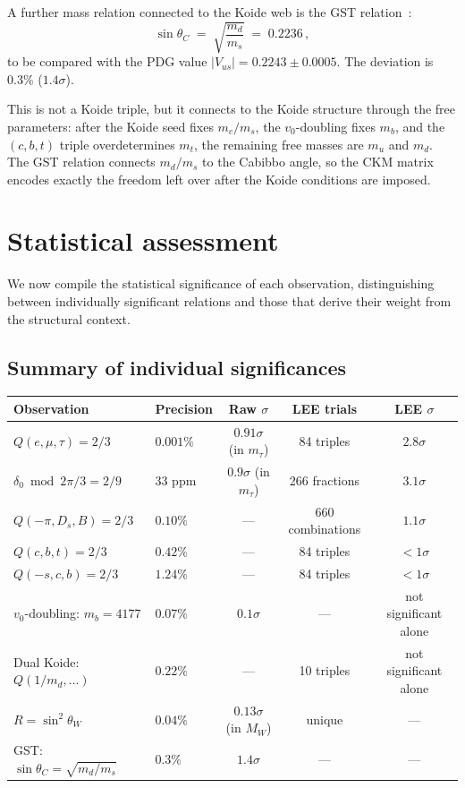 \documentclass[12pt,a4paper]{article}
\begin{document}
A further mass relation connected to the Koide web is the GST
relation~\cite{GST1968}:
\begin{equation}
\sin\theta_C \;=\; \sqrt{\frac{m_d}{m_s}} \;=\; 0.2236\,,
\end{equation}
to be compared with the PDG value $|V_{us}| = 0.2243 \pm 0.0005$.
The deviation is $0.3\%$ ($1.4\sigma$).

This is not a Koide triple, but it connects to the Koide structure
through the free parameters: after the Koide seed fixes $m_c/m_s$,
the $v_0$-doubling fixes $m_b$, and the $(c,b,t)$ triple
overdetermines $m_t$, the remaining free masses are $m_u$ and $m_d$.
The GST relation connects $m_d/m_s$ to the Cabibbo angle, so the
CKM matrix encodes exactly the freedom left over after the Koide
conditions are imposed.

\section{Statistical assessment}

We now compile the statistical significance of each observation,
distinguishing between individually significant relations and those
that derive their weight from the structural context.

\subsection{Summary of individual significances}

\begin{center}
\small
\begin{tabular}{llccc}
\toprule
Observation & Precision & Raw $\sigma$ & LEE trials & LEE $\sigma$ \\
\midrule
$Q(e,\mu,\tau) = 2/3$ & $0.001\%$ & $0.91\sigma$ (in $m_\tau$) & 84 triples & $2.8\sigma$ \\
$\delta_0 \bmod 2\pi/3 = 2/9$ & 33 ppm & $0.9\sigma$ (in $m_\tau$) & 266 fractions & $3.1\sigma$ \\
$Q(-\pi,D_s,B) = 2/3$ & $0.10\%$ & --- & 660 combinations & $1.1\sigma$ \\
$Q(c,b,t) = 2/3$ & $0.42\%$ & --- & 84 triples & $<1\sigma$ \\
$Q(-s,c,b) = 2/3$ & $1.24\%$ & --- & 84 triples & $<1\sigma$ \\
$v_0$-doubling: $m_b = 4177$ & $0.07\%$ & $0.1\sigma$ & --- & not significant alone \\
Dual Koide: $Q(1/m_d,\ldots)$ & $0.22\%$ & --- & 10 triples & not significant alone \\
$R = \sin^2\theta_W$ & $0.04\%$ & $0.13\sigma$ (in $M_W$) & unique & --- \\
GST: $\sin\theta_C = \sqrt{m_d/m_s}$ & $0.3\%$ & $1.4\sigma$ & --- & --- \\
\bottomrule
\end{tabular}
\end{center}
\end{document}
